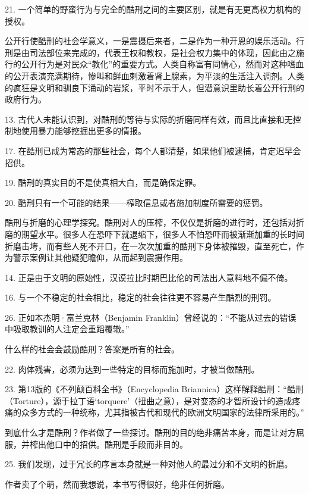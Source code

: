 21. 一个简单的野蛮行为与完全的酷刑之间的主要区别，就是有无更高权力机构的授权。



公开行使酷刑的社会学意义，一是震摄后来者，二是作为一种开恩的娱乐活动。行刑是由司法部位来完成的，代表王权和教权，是社会权力集中的体现，因此由之施行的公开行为是对民众“教化”的重要方式。人类自称富有同情心，然而对这种嗜血的公开表演充满期待，惨叫和鲜血刺激着肾上腺素，为平淡的生活注入调剂。人类的疯狂是文明和驯良下涌动的岩浆，平时不示于人，但潜意识里助长着公开行刑的政府行为。


13. 古代人未能认识到，对酷刑的等待与实际的折磨同样有效，而且比直接和无控制地使用暴力能够挖掘出更多的情报。

17. 在酷刑已成为常态的那些社会，每个人都清楚，如果他们被逮捕，肯定迟早会招供。

19. 酷刑的真实目的不是使真相大白，而是确保定罪。

20. 酷刑只有一个可能的结果——榨取信息或者施加制度所需要的惩罚。

酷刑与折磨的心理学探究。酷刑对人的压榨，不仅仅是折磨的进行时，还包括对折磨的期望水平。很多人在恐吓下就退缩下，很多人不怕恐吓而被渐渐加重的长时间折磨击垮，而有些人死不开口，在一次次加重的酷刑下身体被摧毁，直至死亡，作为警示案例让其他疑犯瞻仰，从而起到震摄作用。


14. 正是由于文明的原始性，汉谟拉比时期巴比伦的司法出人意料地不偏不倚。

16. 与一个不稳定的社会相比，稳定的社会往往更不容易产生酷烈的刑罚。

26. 正如本杰明·富兰克林（Benjamin Franklin）曾经说的：“不能从过去的错误中吸取教训的人注定会重蹈覆辙。”

什么样的社会会鼓励酷刑？答案是所有的社会。


22. 肉体残害，必须为达到一些特定的目标而施加时，才被当做酷刑。

23. 第13版的《不列颠百科全书》（Encyclopedia Briannica）这样解释酷刑：“酷刑（Torture），源于拉丁语‘torquere’（扭曲之意），是对变态的才智所设计的造成疼痛的众多方式的一种统称，尤其指被古代和现代的欧洲文明国家的法律所采用的。”

到底什么才是酷刑？作者做了一些探讨。酷刑的目的绝非痛苦本身，而是让对方屈服，并榨出他口中的招供。酷刑是手段而非目的。

25. 我们发现，过于冗长的序言本身就是一种对他人的最过分和不文明的折磨。

作者卖了个萌，然而我想说，本书写得很好，绝非任何折磨。
